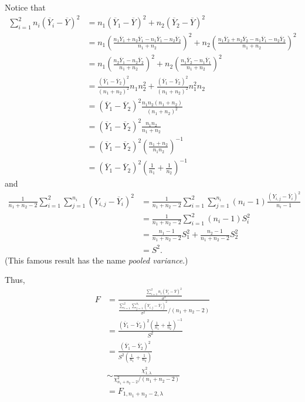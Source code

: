 \documentclass[a4paper]{article}
\begin{document}
Notice that
\begin{align*}
\sum_{i=1}^{2} n_{i}\left(\overline{Y}_{i} - \overline{Y}\right)^2
&= n_{1}\left(\overline{Y}_{1} - \overline{Y}\right)^2 + n_{2}\left(\overline{Y}_{2} - \overline{Y}\right)^2\\
&= n_{1}\left(\frac{n_{1}\overline{Y}_{1}+n_{2}\overline{Y}_{1}-n_{1}\overline{Y}_{1}-n_{2}\overline{Y}_{2}}{n_{1}+n_{2}}\right)^2 + n_{2}\left(\frac{n_{1}\overline{Y}_{2}+n_{2}\overline{Y}_{2}-n_{1}\overline{Y}_{1}-n_{2}\overline{Y}_{2}}{n_{1}+n_{2}}\right)^2\\
&= n_{1}\left(\frac{n_{2}\overline{Y}_{1}-n_{2}\overline{Y}_{2}}{n_{1}+n_{2}}\right)^2 + n_{2}\left(\frac{n_{1}\overline{Y}_{2}-n_{1}\overline{Y}_{1}}{n_{1}+n_{2}}\right)^2\\
&= \frac{(\overline{Y}_{1} - \overline{Y}_{2})^2}{(n_{1}+n_{2})^2} n_{1}n_{2}^2 + \frac{(\overline{Y}_{1} - \overline{Y}_{2})^2}{(n_{1}+n_{2})^2} n_{1}^2 n_{2}\\
&= (\overline{Y}_{1} - \overline{Y}_{2})^2 \frac{n_{1}n_{2}(n_{1}+n_{2})}{(n_{1}+n_{2})^2}\\
&= (\overline{Y}_{1} - \overline{Y}_{2})^2 \frac{n_{1}n_{2}}{n_{1}+n_{2}}\\
&= (\overline{Y}_{1} - \overline{Y}_{2})^2 \left(\frac{n_{1}+n_{2}}{n_{1}n_{2}}\right)^{-1}\\
&= (\overline{Y}_{1} - \overline{Y}_{2})^2 \left(\frac{1}{n_{1}} + \frac{1}{n_{2}}\right)^{-1}
\end{align*}
and
\begin{align*}
\frac{1}{n_{1} +n_{2} -2}\sum_{i=1}^{2} \sum_{j=1}^{n_{i}} \left(Y_{i,j} - \overline{Y}_{i} \right)^2
&= \frac{1}{n_{1} +n_{2} -2}\sum_{i=1}^{2} \sum_{j=1}^{n_{i}} (n_{i}-1)\frac{\left(Y_{i,j} - \overline{Y}_{i} \right)^2}{n_{i}-1}\\
&= \frac{1}{n_{1} +n_{2} -2}\sum_{i=1}^{2} (n_{i}-1) S_{i}^2\\
&= \frac{n_{1} - 1}{n_{1} +n_{2} -2} S_{1}^2 + \frac{n_{2} - 1}{n_{1} +n_{2} -2} S_{2}^2\\
&= S^2.
\end{align*}
(This famous result has the name \textit{pooled variance}.)

Thus,
\begin{align*}
F &= \frac{\frac{\sum_{i=1}^{2} n_{i}\left(\overline{Y}_{i} - \overline{Y}\right)^2}{\sigma^2}}{\frac{\sum_{i=1}^{2} \sum_{j=1}^{n_{i}} \left(Y_{i,j} - \overline{Y}_{i} \right)^2}{\sigma^2}/(n_{1}+n_{2}-2)}\\
&= \frac{(\overline{Y}_{1} - \overline{Y}_{2})^2 \left(\frac{1}{n_{1}} + \frac{1}{n_{2}}\right)^{-1}}{S^2}\\
&= \frac{(\overline{Y}_{1} - \overline{Y}_{2})^2}{S^2\left(\frac{1}{n_{1}} + \frac{1}{n_{2}}\right)}\\
&\sim \frac{\chi_{1, \lambda}^2}{\chi_{n_{1}+n_{2}-2}^2 / (n_{1}+n_{2}-2)}\\
&= F_{1,n_{1}+n_{2}-2,\lambda}
\end{align*}
\end{document}

